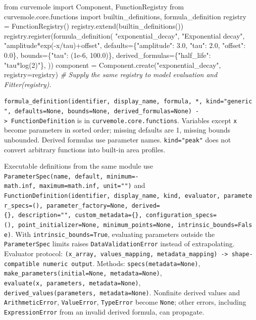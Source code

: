 \documentclass[
  10pt,
  a4paper,
  oneside]{scrreprt}
\newenvironment{Shaded}{}{}
\newcommand{\CommentTok}[1]{\textcolor[rgb]{0.38,0.63,0.69}{\textit{#1}}}
\newcommand{\FloatTok}[1]{\textcolor[rgb]{0.25,0.63,0.44}{#1}}
\newcommand{\ImportTok}[1]{#1}
\newcommand{\NormalTok}[1]{#1}
\newcommand{\OperatorTok}[1]{\textcolor[rgb]{0.40,0.40,0.40}{#1}}
\newcommand{\StringTok}[1]{\textcolor[rgb]{0.25,0.44,0.63}{#1}}
\begin{document}
\begin{Shaded}
\begin{Highlighting}[]
\ImportTok{from}\NormalTok{ curvemole }\ImportTok{import}\NormalTok{ Component, FunctionRegistry}
\ImportTok{from}\NormalTok{ curvemole.core.functions }\ImportTok{import}\NormalTok{ builtin\_definitions, formula\_definition}
\NormalTok{registry }\OperatorTok{=}\NormalTok{ FunctionRegistry()}
\NormalTok{registry.extend(builtin\_definitions())}
\NormalTok{registry.register(formula\_definition(}
    \StringTok{"exponential\_decay"}\NormalTok{, }\StringTok{"Exponential decay"}\NormalTok{, }\StringTok{"amplitude*exp({-}x/tau)+offset"}\NormalTok{,}
\NormalTok{    defaults}\OperatorTok{=}\NormalTok{\{}\StringTok{"amplitude"}\NormalTok{: }\FloatTok{3.0}\NormalTok{, }\StringTok{"tau"}\NormalTok{: }\FloatTok{2.0}\NormalTok{, }\StringTok{"offset"}\NormalTok{: }\FloatTok{0.0}\NormalTok{\},}
\NormalTok{    bounds}\OperatorTok{=}\NormalTok{\{}\StringTok{"tau"}\NormalTok{: (}\FloatTok{1e{-}6}\NormalTok{, }\FloatTok{100.0}\NormalTok{)\},}
\NormalTok{    derived\_formulas}\OperatorTok{=}\NormalTok{\{}\StringTok{"half\_life"}\NormalTok{: }\StringTok{"tau*log(2)"}\NormalTok{\},}
\NormalTok{))}
\NormalTok{component }\OperatorTok{=}\NormalTok{ Component.create(}\StringTok{"exponential\_decay"}\NormalTok{, registry}\OperatorTok{=}\NormalTok{registry)}
\CommentTok{\# Supply the same registry to model evaluation and Fitter(registry).}
\end{Highlighting}
\end{Shaded}

\texttt{formula\_definition(identifier,\ display\_name,\ formula,\ *,\ kind="generic",\ defaults=None,\ bounds=None,\ derived\_formulas=None)\ -\textgreater{}\ FunctionDefinition}
is in \texttt{curvemole.core.functions}. Variables except \texttt{x}
become parameters in sorted order; missing defaults are 1, missing
bounds unbounded. Derived formulas use parameter names.
\texttt{kind="peak"} does not convert arbitrary functions into built-in
area profiles.

Executable definitions from the same module use
\texttt{ParameterSpec(name,\ default,\ minimum=-math.inf,\ maximum=math.inf,\ unit="")}
and
\texttt{FunctionDefinition(identifier,\ display\_name,\ kind,\ evaluator,\ parameter\_specs=(),\ parameter\_factory=None,\ derived=\{\},\ description="",\ custom\_metadata=\{\},\ configuration\_specs=(),\ point\_initializer=None,\ minimum\_points=None,\ intrinsic\_bounds=False)}.
With \texttt{intrinsic\_bounds=True}, evaluating parameters outside the
\texttt{ParameterSpec} limits raises \texttt{DataValidationError}
instead of extrapolating. Evaluator protocol:
\texttt{(x\_array,\ values\_mapping,\ metadata\_mapping)\ -\textgreater{}\ shape-compatible\ numeric\ output}.
Methods: \texttt{specs(metadata=None)},
\texttt{make\_parameters(initial=None,\ metadata=None)},
\texttt{evaluate(x,\ parameters,\ metadata=None)},
\texttt{derived\_values(parameters,\ metadata=None)}. Nonfinite derived
values and \texttt{ArithmeticError}, \texttt{ValueError},
\texttt{TypeError} become \texttt{None}; other errors, including
\texttt{ExpressionError} from an invalid derived formula, can propagate.
\end{document}
